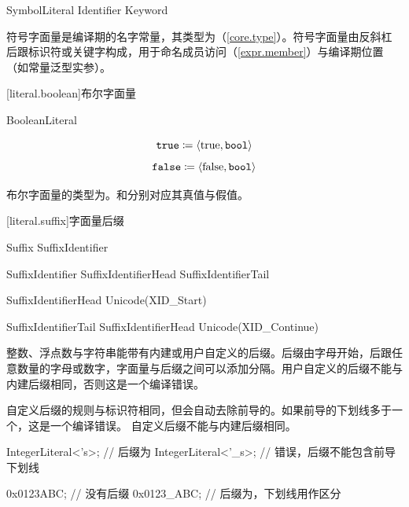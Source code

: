 \begin{bnf}{SymbolLiteral}
    \terminal{\textbackslash} Identifier \br
    \terminal{\textbackslash} Keyword
\end{bnf}

\pnum
符号字面量是编译期的名字常量，其类型为（\ref{core.type}）。符号字面量由反斜杠后跟标识符或关键字构成，用于命名成员访问（\ref{expr.member}）与编译期位置（如常量泛型实参）。

[literal.boolean]{布尔字面量}

\begin{bnf}{BooleanLiteral}
     \br
\end{bnf}

$$ \texttt{true} \coloneqq \langle \mathrm{true}, \texttt{bool} \rangle $$
$$ \texttt{false} \coloneqq \langle \mathrm{false}, \texttt{bool} \rangle $$

\pnum
布尔字面量的类型为。和分别对应其真值与假值。

[literal.suffix]{字面量后缀}

\begin{bnf}{Suffix}
    \terminal{_}\bnfq SuffixIdentifier
\end{bnf}

\begin{bnf}{SuffixIdentifier}
    SuffixIdentifierHead SuffixIdentifierTail\bnfs
\end{bnf}

\begin{bnf}{SuffixIdentifierHead}
    Unicode(XID_Start)
\end{bnf}

\begin{bnf}{SuffixIdentifierTail}
    SuffixIdentifierHead \br
    Unicode(XID_Continue)
\end{bnf}

\pnum
整数、浮点数与字符串能带有内建或用户自定义的后缀。后缀由字母开始，后跟任意数量的字母或数字，字面量与后缀之间可以添加\tcode{_}分隔。用户自定义的后缀不能与内建后缀相同，否则这是一个编译错误。

\pnum
自定义后缀的规则与标识符相同，但会自动去除前导的\tcode{_}。如果前导的下划线多于一个，这是一个编译错误。
自定义后缀不能与内建后缀相同。

\enterexample
\begin{codeblock}
IntegerLiteral<'s>; // 后缀为
IntegerLiteral<'_s>; // 错误，后缀不能包含前导下划线

0x0123ABC; // 没有后缀
0x0123_ABC; // 后缀为，下划线用作区分
\end{codeblock}
\exitexample


